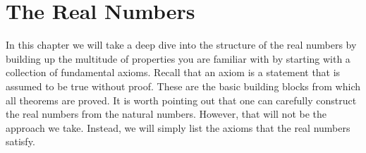 \chapter{The Real Numbers}\label{chap:RealNumbers}


In this chapter we will take a deep dive into the structure of the real numbers by building up the multitude of properties you are familiar with by starting with a collection of fundamental axioms. Recall that an axiom is a statement that is assumed to be true without proof. These are the basic building blocks from which all theorems are proved. It is worth pointing out that one can carefully construct the real numbers from the natural numbers.  However, that will not be the approach we take.  Instead, we will simply list the axioms that the real numbers satisfy.   